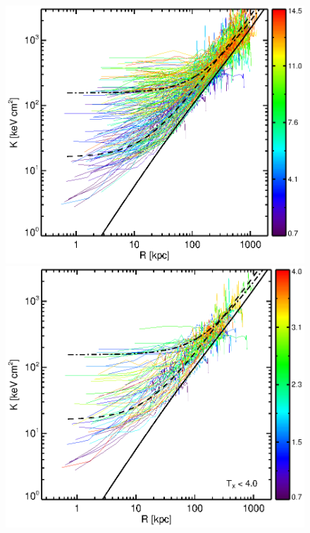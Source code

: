 \clearpage
\begin{center}
  \begin{figure}[htp]
    \begin{minipage}[htp]{0.5\linewidth}
      \includegraphics*[width=\textwidth, trim=28mm 7mm 30mm 17mm, clip]{splots_allt.eps}
    \end{minipage}
    \begin{minipage}[htp]{0.5\linewidth}
      \includegraphics*[width=\textwidth, trim=28mm 7mm 30mm 17mm, clip]{splots_tle4.eps}

\end{minipage}
\end{figure}
\end{center}
